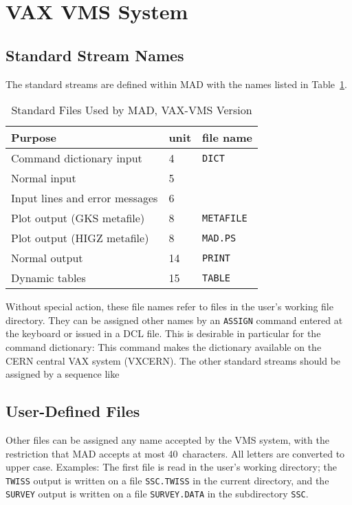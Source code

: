\section{VAX VMS System}
\label{S-VMS}
\subsection{Standard Stream Names}
The standard streams are defined within MAD with the names listed in
Table~\ref{T-VAX}.
\begin{table}[ht]
\caption{Standard Files Used by MAD, VAX-VMS Version}
\vspace{1ex}
\label{T-VAX}
\centering
\begin{tabular}{|l|l|l|}
\hline
Purpose                         &unit  &file name \\
\hline
Command dictionary input        & 4    &{\tt DICT} \\
Normal input                    & 5    & \\
Input lines and error messages  & 6    & \\
Plot output (GKS metafile)      & 8    &{\tt METAFILE} \\
Plot output (HIGZ metafile)     & 8    &{\tt MAD.PS} \\
Normal output                   &14    &{\tt PRINT} \\
Dynamic tables                  &15    &{\tt TABLE} \\
\hline
\end{tabular}
\end{table}
Without special action, these file names refer to files in the
user's working file directory.
They can be assigned other names by an {\tt ASSIGN} command
entered at the keyboard or issued in a DCL file.
This is desirable in particular for the command dictionary:
This command makes the dictionary available on the CERN central
VAX system (VXCERN).
The other standard streams should be assigned by a sequence like

\subsection{User-Defined Files}
Other files can be assigned any name accepted by the VMS system,
with the restriction that MAD accepts at most 40~characters.
All letters are converted to upper case.
Examples:
The first file is read in the user's working directory;
the {\tt TWISS} output is written
on a file {\tt SSC.TWISS} in the current
directory,
and the {\tt SURVEY} output is written on a file {\tt SURVEY.DATA}
in the subdirectory {\tt SSC}.


